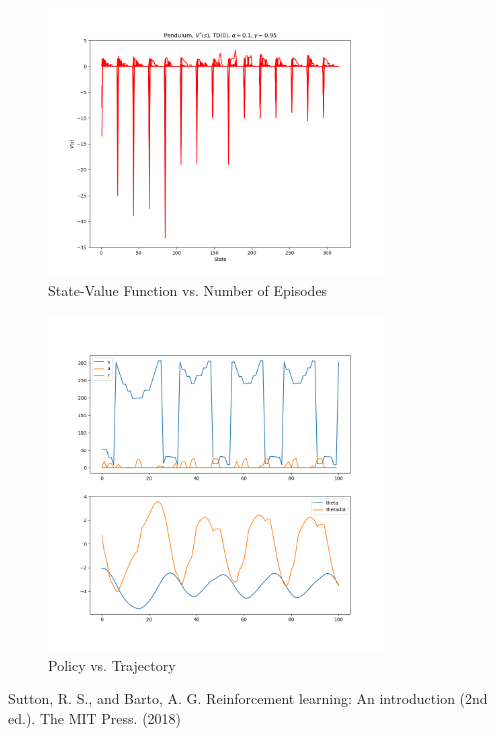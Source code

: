 \documentclass[conference]{IEEEtran}
\begin{document}
\begin{figure}[!htbp]
\centerline{\includegraphics[width=3.5in]{p_ql_state_value}}
\caption{State-Value Function vs. Number of Episodes}
\label{fig}
\end{figure}
\FloatBarrier

\begin{figure}[!htbp]
\centerline{\includegraphics[width=3.5in]{p_ql_policy_vs_trajec}}
\caption{Policy vs. Trajectory}
\label{fig}
\end{figure}
\FloatBarrier

\begin{thebibliography}{00}
  Sutton, R. S., and Barto, A. G. Reinforcement learning: An introduction (2nd ed.). The MIT Press. (2018)
\end{thebibliography}
\vspace{12pt}
\end{document}
